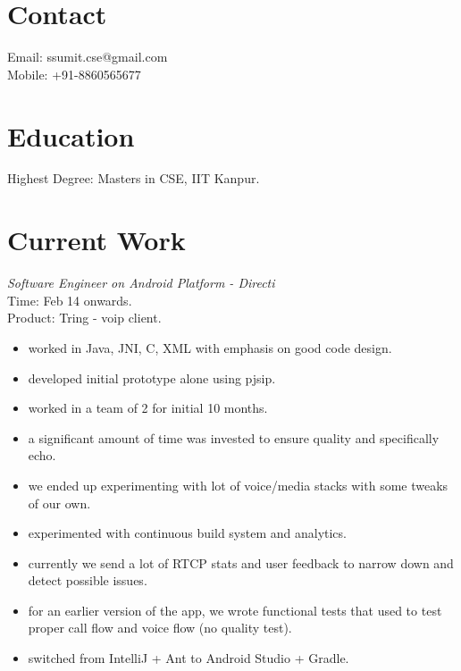 \documentclass[margin,line]{resume}
\begin{document}
\begin{resume}

    \section{\mysidestyle Contact}
    	Email: ssumit.cse@gmail.com\\
    	Mobile: +91-8860565677\\
    \section{\mysidestyle Education}
	Highest Degree: Masters in CSE, IIT Kanpur.

    \section{\mysidestyle Current Work}

\textit{Software Engineer on Android Platform - Directi} \\
Time: Feb 14 onwards.\\
Product: Tring - voip client.\\
\begin{itemize}
	\item worked in Java, JNI, C, XML with emphasis on good code design.
        \item developed initial prototype alone using pjsip.
        \item worked in a team of 2 for initial 10 months.
	\item a significant amount of time was invested to ensure quality and specifically echo.
	\item we ended up experimenting with lot of voice/media stacks with some tweaks of our own.
	\item experimented with continuous build system and analytics.
	\item currently we send a lot of RTCP stats and user feedback to narrow down and detect possible issues.
	\item for an earlier version of the app, we wrote functional tests that used to test proper call flow and voice flow (no quality test). 
	\item switched from IntelliJ + Ant to Android Studio + Gradle. 
 \end{itemize}


\end{resume}
\end{document}
